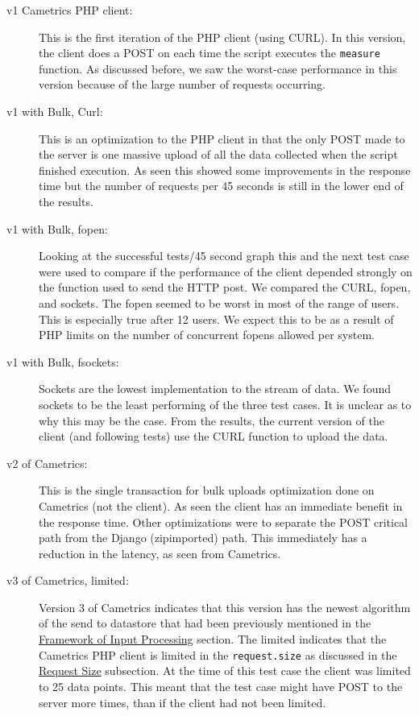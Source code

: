 \documentclass[10pt,a4paper,english]{article}
\begin{document}
\begin{description}
\item[{v1 Cametrics PHP client:}] \leavevmode 
This is the first iteration of the PHP client (using CURL). In this version, the client does a POST on each time the script executes the \texttt{measure} function. As discussed before, we saw the worst-case performance in this version because of the large number of requests occurring.

\item[{v1 with Bulk, Curl:}] \leavevmode 
This is an optimization to the PHP client in that the only POST made to the server is one massive upload of all the data collected when the script finished execution. As seen this showed some improvements in the response time but the number of requests per 45 seconds is still in the lower end of the results.

\item[{v1 with Bulk, fopen:}] \leavevmode 
Looking at the successful tests/45 second graph this and the next test case were used to compare if the performance of the client depended strongly on the function used to send the HTTP post. We compared the CURL, fopen, and sockets. The fopen seemed to be worst in most of the range of users. This is especially true after 12 users. We expect this to be as a result of PHP limits on the number of concurrent fopens allowed per system.

\item[{v1 with Bulk, fsockets:}] \leavevmode 
Sockets are the lowest implementation to the stream of data. We found sockets to be the least performing of the three test cases. It is unclear as to why this may be the case. From the results, the current version of the client (and following tests) use the CURL function to upload the data.

\item[{v2 of Cametrics:}] \leavevmode 
This is the single transaction for bulk uploads optimization done on Cametrics (not the client). As seen the client has an immediate benefit in the response time. Other optimizations were to separate the POST critical path from the Django (zipimported) path. This immediately has a reduction in the latency, as seen from Cametrics.

\item[{v3 of Cametrics, limited:}] \leavevmode 
Version 3 of Cametrics indicates that this version has the newest algorithm of the send to datastore that had been previously mentioned in the \href{\#framework-of-input-processing}{Framework of Input Processing} section. The limited indicates that the Cametrics PHP client is limited in the \texttt{request.size} as discussed in the \href{\#request-size}{Request Size} subsection. At the time of this test case the client was limited to 25 data points. This meant that the test case might have POST to the server more times, than if the client had not been limited.


\end{description}
\end{document}
